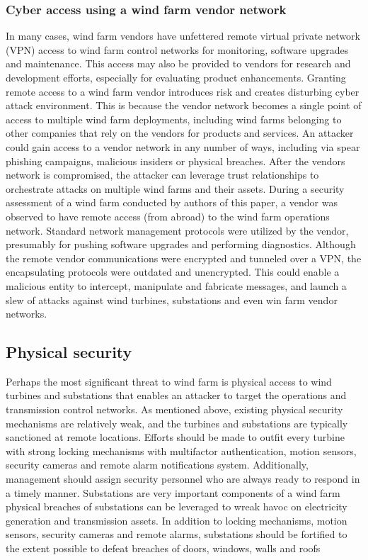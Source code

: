 \documentclass[twosided,a4,10pt]{article}
\begin{document}
\begin{multicols}{2}
 \subsubsection{Cyber access using a wind farm vendor network}
 In many cases, wind farm vendors have unfettered remote virtual private network (VPN) access to wind farm control networks for monitoring, software upgrades and maintenance. This access may also be provided to vendors for research and development efforts, especially for evaluating product enhancements. Granting remote access to a wind farm vendor introduces risk and creates disturbing cyber attack environment. This is because the vendor network becomes a single point of access to multiple wind farm deployments, including wind farms belonging to other companies that rely on the vendors for products and services. An attacker could gain access to a vendor network in any number of ways, including via spear phishing campaigns, malicious insiders or physical breaches. After the vendors network is compromised, the attacker can leverage trust relationships to orchestrate attacks on multiple wind farms and their assets. During a security assessment of a wind farm conducted by authors of this paper, a vendor was observed to have remote access (from abroad) to the wind farm operations network. Standard network management protocols were utilized by the vendor, presumably for pushing software upgrades and performing diagnostics. Although the remote vendor communications were encrypted and tunneled over a VPN, the encapsulating protocols were outdated and unencrypted. This could enable a malicious entity to intercept, manipulate and fabricate messages, and launch a slew of attacks against wind turbines, substations and even win farm vendor networks.
 

\subsection{Physical security} 
Perhaps the most significant threat to wind farm is physical access to wind turbines and substations that enables an attacker to target the operations and transmission control networks. As mentioned above, existing physical security mechanisms are relatively weak, and the turbines and substations are typically sanctioned at remote locations. Efforts should be made to outfit every turbine with strong locking mechanisms with multifactor authentication, motion sensors, security cameras and remote alarm notifications system. Additionally, management should assign security personnel who are always ready to respond in a timely manner. Substations are very important components of a wind farm physical breaches of substations can be leveraged to wreak havoc on electricity generation and transmission assets. In addition to locking mechanisms, motion sensors, security cameras and remote alarms, substations should be fortified to the extent possible to defeat breaches of doors, windows, walls and roofs
 

\end{multicols}
\end{document}
